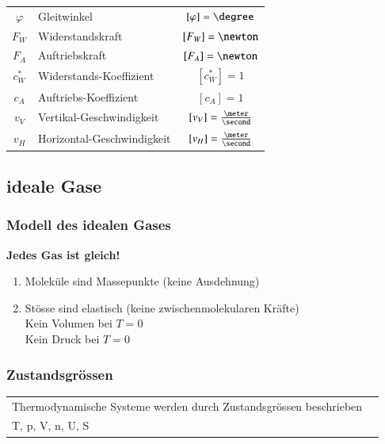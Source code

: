 \renewcommand{\arraystretch}{1.3}
\begin{tabular}{c l c}
	$\varphi$   & Gleitwinkel                   & $[\varphi] = \degree$             \\
	$F_W$       & Widerstandskraft              & $[F_W] = \newton$                 \\
	$F_A$       & Auftriebskraft                & $[F_A] = \newton$                 \\ 
	$c^*_W$     & Widerstands-Koeffizient       & $[c^*_W] = 1$                     \\
	$c_A$       & Auftriebs-Koeffizient         & $[c_A] = 1$                       \\
	$v_V$       & Vertikal-Geschwindigkeit      & $[v_V] = \frac{\meter}{\second}$  \\
	$v_H$       & Horizontal-Geschwindigkeit    & $[v_H] = \frac{\meter}{\second}$
\end{tabular}
\renewcommand{\arraystretch}{1}



\subsection{ideale Gase}

\subsubsection{Modell des idealen Gases}

\textbf{Jedes Gas ist gleich!}

\medskip

\begin{enumerate}
	\item Moleküle sind Massepunkte (keine Ausdehnung)
	\item Stösse sind elastisch (keine zwischenmolekularen Kräfte) \\
	Kein Volumen bei $T = 0$ \\
	Kein Druck bei $T = 0$
\end{enumerate}

\subsubsection{Zustandsgrössen}
\begin{tabular} {ll}
	Thermodynamische Systeme werden durch Zustandsgrössen beschrieben &  \\
	T, p, V, n, U, S & \\
\end{tabular}

